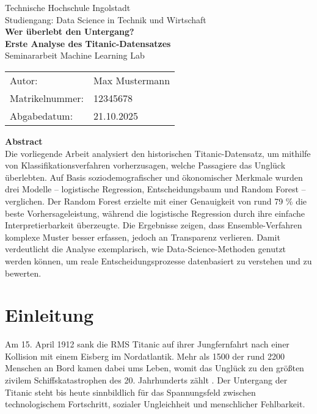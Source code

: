 \documentclass[12pt,a4paper]{article}
\begin{document}
\begin{titlepage}
  \centering
  {\Large Technische Hochschule Ingolstadt}\\[6pt]
  {\large Studiengang: Data Science in Technik und Wirtschaft}\\[28pt]

  {\huge \textbf{Wer überlebt den Untergang?}}\\[10pt]
  {\LARGE \textbf{Erste Analyse des Titanic-Datensatzes}}\\[32pt]

  {\large Seminararbeit Machine Learning Lab}\\[24pt]

  \begin{tabular}{ll}
    Autor: & Max Mustermann \\
    Matrikelnummer: & 12345678 \\
    Abgabedatum: & 21.10.2025\\[32pt]
  \end{tabular}

  \begin{minipage}{0.85\textwidth}
    \textbf{Abstract} \\[4pt]
    Die vorliegende Arbeit analysiert den historischen Titanic-Datensatz, um mithilfe von Klassifikationsverfahren vorherzusagen, welche Passagiere das Unglück überlebten. Auf Basis soziodemografischer und ökonomischer Merkmale wurden drei Modelle – logistische Regression, Entscheidungsbaum und Random Forest – verglichen. Der Random Forest erzielte mit einer Genauigkeit von rund 79 \% die beste Vorhersageleistung, während die logistische Regression durch ihre einfache Interpretierbarkeit überzeugte. Die Ergebnisse zeigen, dass Ensemble-Verfahren komplexe Muster besser erfassen, jedoch an Transparenz verlieren. Damit verdeutlicht die Analyse exemplarisch, wie Data-Science-Methoden genutzt werden können, um reale Entscheidungsprozesse datenbasiert zu verstehen und zu bewerten.
  \end{minipage}

\end{titlepage}

\section{Einleitung}

Am 15. April 1912 sank die RMS Titanic auf ihrer Jungfernfahrt nach einer Kollision mit einem Eisberg im Nordatlantik.
Mehr als 1500 der rund 2200 Menschen an Bord kamen dabei ums Leben, womit das Unglück zu den größten zivilem Schiffs­katastrophen des 20. Jahrhunderts zählt \citep{BBC2024Titanic, BritannicaTitanic}. Der Untergang der Titanic steht bis heute sinnbildlich für das Spannungsfeld zwischen technologischem Fortschritt, sozialer Ungleichheit und menschlicher Fehlbarkeit.
\end{document}
